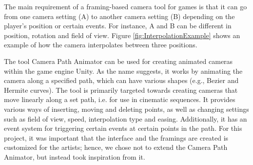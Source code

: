 The main requirement of a framing-based camera tool for games is that it can go from one camera setting (A) to another camera setting (B) depending on the player's position or certain events. For instance, A and B can be different in position, rotation and field of view.
Figure \ref{fig:InterpolationExample} shows an example of how the camera interpolates between three positions.


The tool Camera Path Animator \cite{unity_camTool} can be used for creating animated cameras within the game engine Unity. As the name suggests, it works by animating the camera along a specified path, which can have various shapes (e.g., Bezier and Hermite curves). The tool is primarily targeted towards creating cameras that move linearly along a set path, i.e. for use in cinematic sequences. It provides various ways of inserting, moving and deleting points, as well as changing settings such as field of view, speed, interpolation type and easing. Additionally, it has an event system for triggering certain events at certain points in the path. For this project, it was important that the interface and the framings are created is customized for the artists; hence, we chose not to extend the Camera Path Animator, but instead took inspiration from it.




